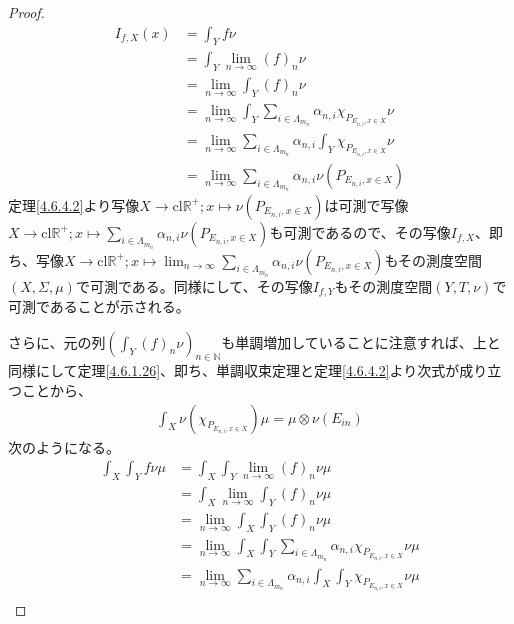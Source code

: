 \documentclass[dvipdfmx]{jsarticle}
\begin{document}
\begin{proof}
\begin{align*}
I_{f,X}(x) &= \int_{Y} {f\nu}\\
&= \int_{Y} {\lim_{n \rightarrow \infty}(f)_{n}\nu}\\
&= \lim_{n \rightarrow \infty}{\int_{Y} {(f)_{n}\nu}}\\
&= \lim_{n \rightarrow \infty}{\int_{Y} {\sum_{i \in \varLambda_{m_{n}}} {\alpha_{n,i}\chi_{P_{E_{n,i},x \in X}}}\nu}}\\
&= \lim_{n \rightarrow \infty}{\sum_{i \in \varLambda_{m_{n}}} {\alpha_{n,i}\int_{Y} {\chi_{P_{E_{n,i},x \in X}}\nu}}}\\
&= \lim_{n \rightarrow \infty}{\sum_{i \in \varLambda_{m_{n}}} {\alpha_{n,i}\nu\left( P_{E_{n,i},x \in X} \right)}}
\end{align*}
定理\ref{4.6.4.2}より写像$X \rightarrow \mathrm{cl}\mathbb{R}^{+};x \mapsto \nu\left( P_{E_{n,i},x \in X} \right)$は可測で写像$X \rightarrow \mathrm{cl}\mathbb{R}^{+};x \mapsto \sum_{i \in \varLambda_{m_{n}}} {\alpha_{n,i}\nu\left( P_{E_{n,i},x \in X} \right)}$も可測であるので、その写像$I_{f,X}$、即ち、写像$X \rightarrow \mathrm{cl}\mathbb{R}^{+};x \mapsto \lim_{n \rightarrow \infty}{\sum_{i \in \varLambda_{m_{n}}} {\alpha_{n,i}\nu\left( P_{E_{n,i},x \in X} \right)}}$もその測度空間$(X,\varSigma,\mu)$で可測である。同様にして、その写像$I_{f,Y}$もその測度空間$(Y,T,\nu)$で可測であることが示される。\par
さらに、元の列$\left( \int_{Y} {(f)_{n}\nu} \right)_{n \in \mathbb{N}}$も単調増加していることに注意すれば、上と同様にして定理\ref{4.6.1.26}、即ち、単調収束定理と定理\ref{4.6.4.2}より次式が成り立つことから、
\begin{align*}
\int_{X} {\nu\left( \chi_{P_{E_{n,i},x \in X}} \right)\mu} = \mu \otimes \nu\left( E_{in} \right)
\end{align*}
次のようになる。
\begin{align*}
\int_{X} {\int_{Y} {f\nu}\mu} &= \int_{X} {\int_{Y} {\lim_{n \rightarrow \infty}(f)_{n}\nu}\mu}\\
&= \int_{X} {\lim_{n \rightarrow \infty}{\int_{Y} {(f)_{n}\nu}}\mu}\\
&= \lim_{n \rightarrow \infty}{\int_{X} {\int_{Y} {(f)_{n}\nu}\mu}}\\
&= \lim_{n \rightarrow \infty}{\int_{X} {\int_{Y} {\sum_{i \in \varLambda_{m_{n}}} {\alpha_{n,i}\chi_{P_{E_{n,i},x \in X}}}\nu}\mu}}\\
&= \lim_{n \rightarrow \infty}{\sum_{i \in \varLambda_{m_{n}}} {\alpha_{n,i}\int_{X} {\int_{Y} {\chi_{P_{E_{n,i},x \in X}}\nu}\mu}}}\\

\end{align*}
\end{proof}
\end{document}
